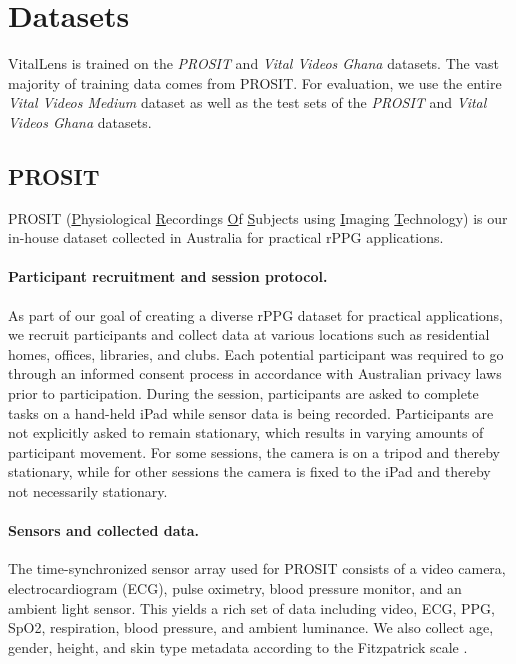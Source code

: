 \documentclass{article}
\begin{document}
\section{Datasets}
\label{sec:datasets}

VitalLens is trained on the \textit{PROSIT} and \textit{Vital Videos Ghana} datasets.
The vast majority of training data comes from PROSIT.
For evaluation, we use the entire \textit{Vital Videos Medium} dataset as well as the test sets of the \textit{PROSIT} and \textit{Vital Videos Ghana} datasets.

\subsection{PROSIT}

PROSIT (\underline{P}hysiological \underline{R}ecordings \underline{O}f \underline{S}ubjects using \underline{I}maging \underline{T}echnology) is our in-house dataset collected in Australia for practical rPPG applications.

\paragraph{Participant recruitment and session protocol.} 
As part of our goal of creating a diverse rPPG dataset for practical applications, we recruit participants and collect data at various locations such as residential homes, offices, libraries, and clubs.
Each potential participant was required to go through an informed consent process in accordance with Australian privacy laws prior to participation.
During the session, participants are asked to complete tasks on a hand-held iPad while sensor data is being recorded.
Participants are not explicitly asked to remain stationary, which results in varying amounts of participant movement.
For some sessions, the camera is on a tripod and thereby stationary, while for other sessions the camera is fixed to the iPad and thereby not necessarily stationary.

\paragraph{Sensors and collected data.}
The time-synchronized sensor array used for PROSIT consists of a video camera, electrocardiogram (ECG), pulse oximetry, blood pressure monitor, and an ambient light sensor.
This yields a rich set of data including video, ECG, PPG, SpO2, respiration, blood pressure, and ambient luminance.
We also collect age, gender, height, and skin type metadata according to the Fitzpatrick scale \cite{fitzpatrick1975soleil}.
\end{document}
